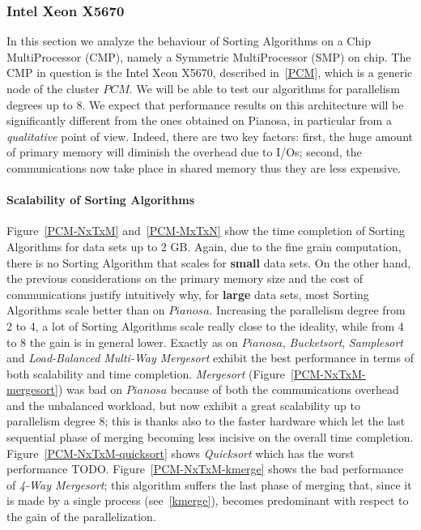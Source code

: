 \subsubsection{Intel Xeon X5670}
In this section we analyze the behaviour of Sorting Algorithms on a Chip MultiProcessor (CMP), namely a Symmetric MultiProcessor (SMP) on chip. The CMP in question is the Intel Xeon X5670, described in~\ref{PCM}, which is a generic node of the cluster $PCM$. We will be able to test our algorithms for parallelism degrees up to 8. We expect that performance results on this architecture will be significantly different from the ones obtained on Pianosa, in particular from a \textit{qualitative} point of view. Indeed, there are two key factors: first, the huge amount of primary memory will diminish the overhead due to I/Os; second, the communications now take place in shared memory thus they are less expensive.

\paragraph{Scalability of Sorting Algorithms} Figure~\ref{PCM-NxTxM} and~\ref{PCM-MxTxN} show the time completion of Sorting Algorithms for data sets up to 2 GB. Again, due to the fine grain computation, there is no Sorting Algorithm that scales for \textbf{small} data sets. On the other hand, the previous considerations on the primary memory size and the cost of communications justify intuitively why, for \textbf{large} data sets, most Sorting Algorithms scale better than on $Pianosa$. Increasing the parallelism degree from 2 to 4, a lot of Sorting Algorithms scale really close to the ideality, while from 4 to 8 the gain is in general lower. Exactly as on $Pianosa$, \textit{Bucketsort}, \textit{Samplesort} and \textit{Load-Balanced Multi-Way Mergesort} exhibit the best performance in terms of both scalability and time completion. \textit{Mergesort} (Figure~\ref{PCM-NxTxM-mergesort}) was bad on $Pianosa$ because of both the communications overhead and the unbalanced workload, but now exhibit a great scalability up to parallelism degree 8; this is thanks also to the faster hardware which let the last sequential phase of merging becoming less incisive on the overall time completion. Figure~\ref{PCM-NxTxM-quicksort} shows \textit{Quicksort} which has the worst performance TODO. Figure~\ref{PCM-NxTxM-kmerge} shows the bad performance of \textit{4-Way Mergesort}; this algorithm suffers the last phase of merging that, since it is made by a single process (see~\ref{kmerge}), becomes predominant with respect to the gain of the parallelization.

